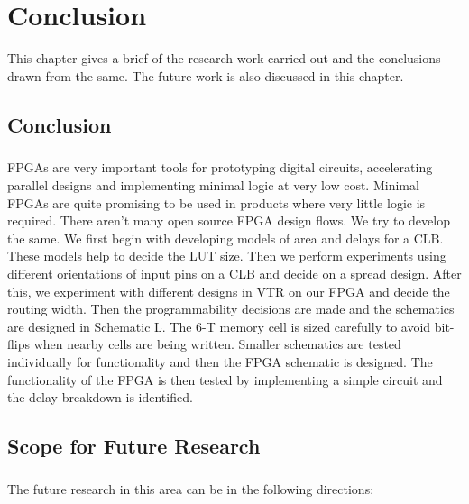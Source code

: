 %
%
\let\textcircled=\pgftextcircled
\chapter{Conclusion}
\label{chap:conclusion}

This chapter gives a brief of the research work carried out and the conclusions drawn from the same. The future work is also discussed in this chapter.

\section{Conclusion}
\paragraph{}

FPGAs are very important tools for prototyping digital circuits, accelerating parallel designs and implementing minimal logic at very low cost. Minimal FPGAs are quite promising to be used in products where very little logic is required. There aren't many open source FPGA design flows. We try to develop the same. We first begin with developing models of area and delays for a CLB. These models help to decide the LUT size. Then we perform experiments using different orientations of input pins on a CLB and decide on a spread design. After this, we experiment with different designs in VTR on our FPGA and decide the routing width. Then the programmability decisions are made and the schematics are designed in Schematic L. The 6-T memory cell is sized carefully to avoid bit-flips when nearby cells are being written. Smaller schematics are tested individually for functionality and then the FPGA schematic is designed. The functionality of the FPGA is then tested by implementing a simple circuit and the delay breakdown is identified. 
 
\section{Scope for Future Research}
\paragraph{}

The future research in this area can be in the following directions:


